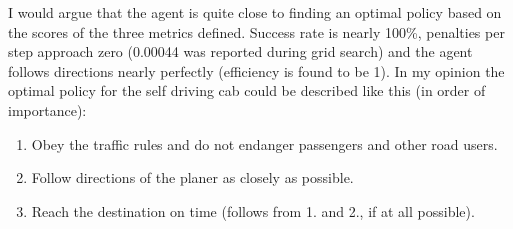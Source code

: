 \documentclass[11pt]{article}
\begin{document}
I would argue that the agent is quite close to finding an optimal policy based on the scores of the three metrics defined. Success rate is nearly 100\%, penalties per step approach zero (0.00044 was reported during grid search) and the agent follows directions nearly perfectly (efficiency is found to be 1). In my opinion the optimal policy for the self driving cab could be described like this (in order of importance):
\begin{enumerate}
    \item Obey the traffic rules and do not endanger passengers and other road users.
    \item Follow directions of the planer as closely as possible.
    \item Reach the destination on time (follows from 1. and 2., if at all possible).
\end{enumerate}
\end{document}
